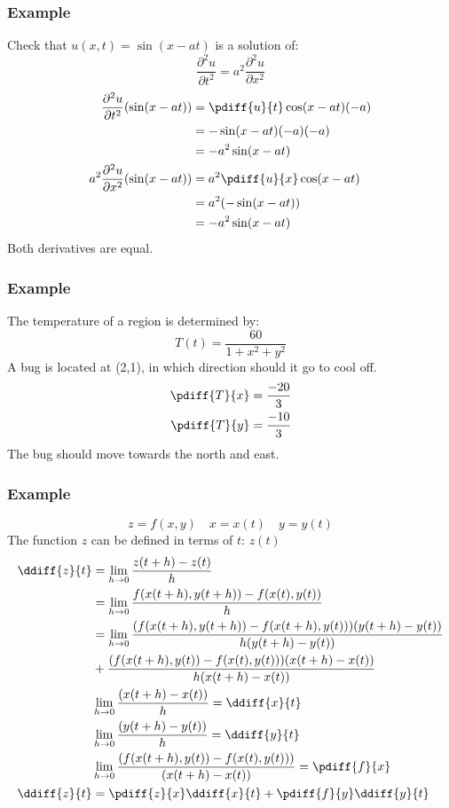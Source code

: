 \documentclass{math}
\begin{document}
\subsubsection*{Example}
Check that \( u(x,t) = \sin(x-at) \) is a solution of:
\[ \frac{\partial^2{u}}{\partial{t^2}} =
  a^2\frac{\partial^2{u}}{\partial{x^2}} \]
\begin{align*}
  \frac{\partial^2{u}}{\partial{t^2}}(\sin(x-at)) &=
    \pdiff{u}{t}\cos(x-at)(-a) \\
  &= -\sin(x-at)(-a)(-a) \\
  &= -a^2\sin(x-at) \\
  a^2\frac{\partial^2{u}}{\partial{x^2}}(\sin(x-at)) &=
    a^2\pdiff{u}{x}\cos(x-at) \\
  &= a^2(-\sin(x-at)) \\
  &= -a^2\sin(x-at)
\end{align*}
Both derivatives are equal.

\subsubsection*{Example}
The temperature of a region is determined by:
\[ T(t) = \frac{60}{1+x^2+y^2} \]
A bug is located at (2,1), in which direction should it go to cool off.
\begin{align*}
  \pdiff{T}{x} &= \frac{-20}{3} \\
  \pdiff{T}{y} &= \frac{-10}{3}
\end{align*}
The bug should move towards the north and east.

\subsubsection*{Example}
\[ z = f(x,y) \quad x = x(t) \quad y = y(t) \]
The function \( z \) can be defined in terms of \( t \): \( z(t) \)
\begin{align*}
  \ddiff{z}{t} &= \lim_{h\to0}\frac{z(t+h)-z(t)}{h} \\
  &= \lim_{h\to0}\frac{f(x(t+h),y(t+h))-f(x(t),y(t))}{h} \\
  &= \lim_{h\to0}\frac{(f(x(t+h),y(t+h))-f(x(t+h),y(t)))(y(t+h)-y(t))}
    {h(y(t+h)-y(t))} \\
  &+\frac{(f(x(t+h),y(t))-f(x(t),y(t)))(x(t+h)-x(t))}{h(x(t+h)-x(t))} \\
  & \lim_{h\to0}\frac{(x(t+h)-x(t))}{h} = \ddiff{x}{t} \\
  & \lim_{h\to0}\frac{(y(t+h)-y(t))}{h} = \ddiff{y}{t} \\
  & \lim_{h\to0}\frac{(f(x(t+h),y(t))-f(x(t),y(t)))}{(x(t+h)-x(t))} =
    \pdiff{f}{x} \\
  \ddiff{z}{t} &= \pdiff{z}{x}\ddiff{x}{t}+\pdiff{f}{y}\ddiff{y}{t}
\end{align*}
\end{document}
